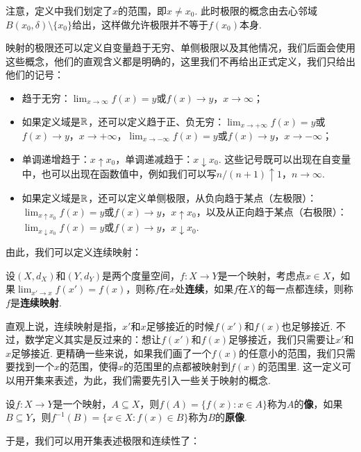注意，定义中我们划定了$x$的范围，即$x\neq x_0$. 此时极限的概念由去心邻域$B(x_0,\delta)\setminus\{x_0\}$给出，这样做允许极限并不等于$f(x_0)$本身. 

\begin{remark}
映射的极限还可以定义自变量趋于无穷、单侧极限以及其他情况，我们后面会使用这些概念，他们的直观含义都是明确的，这里我们不再给出正式定义，我们只给出他们的记号：
\begin{itemize}
    \item 趋于无穷：$\lim_{x\to\infty}f(x)=y$或$f(x)\to y$，$x\to\infty$；
    \item 如果定义域是$\mathbb{R}$，还可以定义趋于正、负无穷：$\lim_{x\to+\infty}f(x)=y$或$f(x)\to y$，$x\to+\infty$，$\lim_{x\to-\infty}f(x)=y$或$f(x)\to y$，$x\to-\infty$；
    \item 单调递增趋于：$x\uparrow x_0$，单调递减趋于：$x\downarrow x_0$. 这些记号既可以出现在自变量中，也可以出现在函数值中，例如我们可以写$n/(n+1)\uparrow 1$，$n\to\infty$.
    \item 如果定义域是$\mathbb{R}$，还可以定义单侧极限，从负向趋于某点（左极限）：$\lim_{x\uparrow x_0}f(x)=y$或$f(x)\to y$，$x\uparrow x_0$，以及从正向趋于某点（右极限）：$\lim_{x\downarrow x_0}f(x)=y$或$f(x)\to y$，$x\downarrow x_0$.
\end{itemize}
\end{remark}

由此，我们可以定义连续映射：
\begin{definition}[连续映射]
    设$(X,d_X)$和$(Y,d_Y)$是两个度量空间，$f:X\to Y$是一个映射，考虑点$x\in X$，如果$\lim_{x'\to x}f(x')=f(x)$，则称$f$在$x$处\textbf{连续}，如果$f$在$X$的每一点都连续，则称$f$是\textbf{连续映射}.
\end{definition}

直观上说，连续映射是指，$x'$和$x$足够接近的时候$f(x')$和$f(x)$也足够接近. 不过，数学定义其实是反过来的：想让$f(x')$和$f(x)$足够接近，我们只需要让$x'$和$x$足够接近. 更精确一些来说，如果我们画了一个$f(x)$的任意小的范围，我们只需要找到一个$x$的范围，使得$x$的范围里的点都被映射到$f(x)$的范围里. 这一定义可以用开集来表述，为此，我们需要先引入一些关于映射的概念. 

\begin{definition}[像，原像]
    设$f:X\to Y$是一个映射，$A\subseteq X$，则$f(A)=\{f(x):x\in A\}$称为$A$的\textbf{像}，如果$B\subseteq Y$，则$f^{-1}(B)=\{x\in X:f(x)\in B\}$称为$B$的\textbf{原像}. 
\end{definition}

于是，我们可以用开集表述极限和连续性了：

